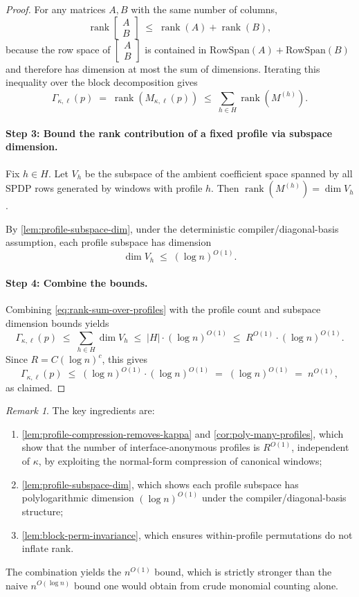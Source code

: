 \documentclass[12pt]{article}
\theoremstyle{definition}
\theoremstyle{remark}
\newtheorem{remark}[theorem]{Remark}
\DeclareMathOperator{\rank}{rank}
\begin{document}
\begin{proof}
For any matrices $A,B$ with the same number of columns,
\[
\rank\!\begin{bmatrix}A\\B\end{bmatrix}
\;\le\;
\rank(A)+\rank(B),
\]
because the row space of $\begin{bmatrix}A\\B\end{bmatrix}$ is contained in
$\mathrm{RowSpan}(A)+\mathrm{RowSpan}(B)$ and therefore has dimension at most the
sum of dimensions. Iterating this inequality over the block decomposition gives
\begin{equation}
\label{eq:rank-sum-over-profiles}
\Gamma_{\kappa,\ell}(p)
\;=\;
\rank(M_{\kappa,\ell}(p))
\;\le\;
\sum_{h\in H} \rank(M^{(h)}).
\end{equation}

\paragraph{Step 3: Bound the rank contribution of a fixed profile via subspace dimension.}
Fix $h\in H$. Let $V_h$ be the subspace of the ambient coefficient space spanned by
all SPDP rows generated by windows with profile $h$. Then $\rank(M^{(h)})=\dim V_h$.

By \ref{lem:profile-subspace-dim}, under the deterministic compiler\slash diagonal-basis
assumption, each profile subspace has dimension
\[
\dim V_h \;\le\; (\log n)^{O(1)}.
\]

\paragraph{Step 4: Combine the bounds.}
Combining \eqref{eq:rank-sum-over-profiles} with the profile count and subspace
dimension bounds yields
\[
\Gamma_{\kappa,\ell}(p)
\;\le\;
\sum_{h\in H} \dim V_h
\;\le\;
|H|\cdot (\log n)^{O(1)}
\;\le\;
R^{O(1)}\cdot (\log n)^{O(1)}.
\]
Since $R = C(\log n)^c$, this gives
\[
\Gamma_{\kappa,\ell}(p)
\;\le\;
(\log n)^{O(1)} \cdot (\log n)^{O(1)}
\;=\;
(\log n)^{O(1)}
\;=\;
n^{O(1)},
\]
as claimed.
\end{proof}

\begin{remark}
The key ingredients are:
\begin{enumerate}
\item[(i)] \ref{lem:profile-compression-removes-kappa} and \ref{cor:poly-many-profiles},
which show that the number of interface-anonymous profiles is $R^{O(1)}$, independent of $\kappa$,
by exploiting the normal-form compression of canonical windows;
\item[(ii)] \ref{lem:profile-subspace-dim}, which shows each profile subspace has
polylogarithmic dimension $(\log n)^{O(1)}$ under the compiler\slash diagonal-basis structure;
\item[(iii)] \ref{lem:block-perm-invariance}, which ensures within-profile permutations
do not inflate rank.
\end{enumerate}
The combination yields the $n^{O(1)}$ bound, which is strictly stronger than the
naive $n^{O(\log n)}$ bound one would obtain from crude monomial counting alone.
\end{remark}
\end{document}
